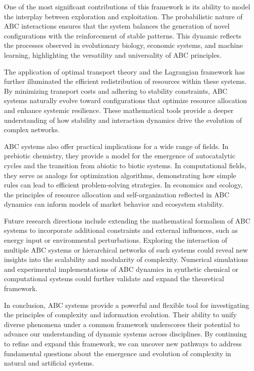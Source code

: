 \documentclass[%
 preprint, linenumbers,
 amsmath,amssymb,
 aps, physrev,
]{revtex4-2}
\begin{document}
One of the most significant contributions of this framework is its ability to model the interplay between exploration and exploitation. The probabilistic nature of ABC interactions ensures that the system balances the generation of novel configurations with the reinforcement of stable patterns. This dynamic reflects the processes observed in evolutionary biology, economic systems, and machine learning, highlighting the versatility and universality of ABC principles.

The application of optimal transport theory and the Lagrangian framework has further illuminated the efficient redistribution of resources within these systems. By minimizing transport costs and adhering to stability constraints, ABC systems naturally evolve toward configurations that optimize resource allocation and enhance systemic resilience. These mathematical tools provide a deeper understanding of how stability and interaction dynamics drive the evolution of complex networks.

ABC systems also offer practical implications for a wide range of fields. In prebiotic chemistry, they provide a model for the emergence of autocatalytic cycles and the transition from abiotic to biotic systems. In computational fields, they serve as analogs for optimization algorithms, demonstrating how simple rules can lead to efficient problem-solving strategies. In economics and ecology, the principles of resource allocation and self-organization reflected in ABC dynamics can inform models of market behavior and ecosystem stability.

Future research directions include extending the mathematical formalism of ABC systems to incorporate additional constraints and external influences, such as energy input or environmental perturbations. Exploring the interaction of multiple ABC systems or hierarchical networks of such systems could reveal new insights into the scalability and modularity of complexity. Numerical simulations and experimental implementations of ABC dynamics in synthetic chemical or computational systems could further validate and expand the theoretical framework.

In conclusion, ABC systems provide a powerful and flexible tool for investigating the principles of complexity and information evolution. Their ability to unify diverse phenomena under a common framework underscores their potential to advance our understanding of dynamic systems across disciplines. By continuing to refine and expand this framework, we can uncover new pathways to address fundamental questions about the emergence and evolution of complexity in natural and artificial systems.
\end{document}
